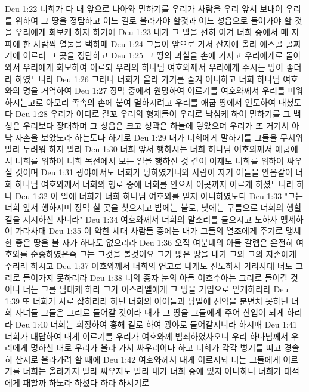 Deu 1:22  너희가 다 내 앞으로 나아와 말하기를 우리가 사람을 우리 앞서 보내어 우리를 위하여 그 땅을 정탐하고 어느 길로 올라가야 할것과 어느 성읍으로 들어가야 할 것을 우리에게 회보케 하자 하기에
Deu 1:23  내가 그 말을 선히 여겨 너희 중에서 매 지파에 한 사람씩 열둘을 택하매
Deu 1:24  그들이 앞으로 가서 산지에 올라 에스골 골짜기에 이르러 그 곳을 정탐하고
Deu 1:25  그 땅의 과실을 손에 가지고 우리에게로 돌아와서 우리에게 회보하여 이르되 우리의 하나님 여호와께서 우리에게 주시는 땅이 좋더라 하였느니라
Deu 1:26  그러나 너희가 올라 가기를 즐겨 아니하고 너희 하나님 여호와의 명을 거역하여
Deu 1:27  장막 중에서 원망하여 이르기를 여호와께서 우리를 미워하시는고로 아모리 족속의 손에 붙여 멸하시려고 우리를 애굽 땅에서 인도하여 내셨도다
Deu 1:28  우리가 어디로 갈꼬 우리의 형제들이 우리로 낙심케 하여 말하기를 그 백성은 우리보다 장대하며 그 성읍은 크고 성곽은 하늘에 닿았으며 우리가 또 거기서 아낙 자손을 보았노라 하는도다 하기로
Deu 1:29  내가 너희에게 말하기를 그들을 무서워 말라 두려워 하지 말라
Deu 1:30  너희 앞서 행하시는 너희 하나님 여호와께서 애굽에서 너희를 위하여 너희 목전에서 모든 일을 행하신 것 같이 이제도 너희를 위하여 싸우실 것이며
Deu 1:31  광야에서도 너희가 당하였거니와 사람이 자기 아들을 안음같이 너희 하나님 여호와께서 너희의 행로 중에 너희를 안으사 이곳까지 이르게 하셨느니라 하나
Deu 1:32  이 일에 너희가 너희 하나님 여호와를 믿지 아니하였도다
Deu 1:33  "그는 너희 앞서 행하시며 장막 칠 곳을 찾으시고 밤에는 불로, 낮에는 구름으로 너희의 행할 길을 지시하신 자니라"
Deu 1:34  여호와께서 너희의 말소리를 들으시고 노하사 맹세하여 가라사대
Deu 1:35  이 악한 세대 사람들 중에는 내가 그들의 열조에게 주기로 맹세한 좋은 땅을 볼 자가 하나도 없으리라
Deu 1:36  오직 여분네의 아들 갈렙은 온전히 여호와를 순종하였은즉 그는 그것을 볼것이요 그가 밟은 땅을 내가 그와 그의 자손에게 주리라 하시고
Deu 1:37  여호와께서 너희의 연고로 내게도 진노하사 가라사대 너도 그리로 들어가지 못하리라
Deu 1:38  너의 종자 눈의 아들 여호수아는 그리로 들어갈 것이니 너는 그를 담대케 하라 그가 이스라엘에게 그 땅을 기업으로 얻게하리라
Deu 1:39  또 너희가 사로 잡히리라 하던 너희의 아이들과 당일에 선악을 분변치 못하던 너희 자녀들 그들은 그리로 들어갈 것이라 내가 그 땅을 그들에게 주어 산업이 되게 하리라
Deu 1:40  너희는 회정하여 홍해 길로 하여 광야로 들어갈지니라 하시매
Deu 1:41  너희가 대답하여 내게 이르기를 우리가 여호와께 범죄하였사오니 우리 하나님께서 우리에게 명하신 대로 우리가 올라 가서 싸우리이다 하고 너희가 각각 병기를 띠고 경솔히 산지로 올라가려 할 때에
Deu 1:42  여호와께서 내게 이르시되 너는 그들에게 이르기를 너희는 올라가지 말라 싸우지도 말라 내가 너희 중에 있지 아니하니 너희가 대적에게 패할까 하노라 하셨다 하라 하시기로
